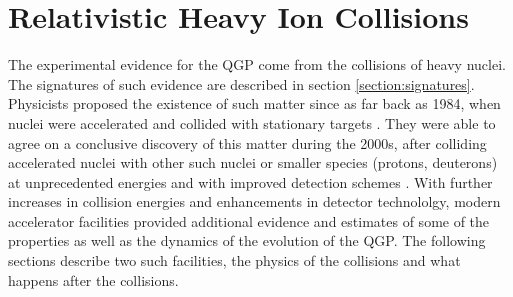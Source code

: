 \chapter{Relativistic Heavy Ion Collisions}\label{ch:RHI-collisions}
The experimental evidence for the QGP come from the collisions of heavy nuclei. The signatures of such evidence are described in section \ref{section:signatures}. Physicists proposed the existence of such matter since as far back as 1984, when nuclei were accelerated and collided with stationary targets \cite{Gyulassy:2004vg}. They were able to agree on a conclusive discovery of this matter during the 2000s, after colliding accelerated nuclei with other such nuclei or smaller species (protons, deuterons) at unprecedented energies and with improved detection schemes \cite{Ritter:2004xj}. With further increases in collision energies and enhancements in detector technololgy, modern accelerator facilities provided additional evidence and estimates of some of the properties as well as the dynamics of the evolution of the QGP. The following sections describe two such facilities, the physics of the collisions and what happens after the collisions.


